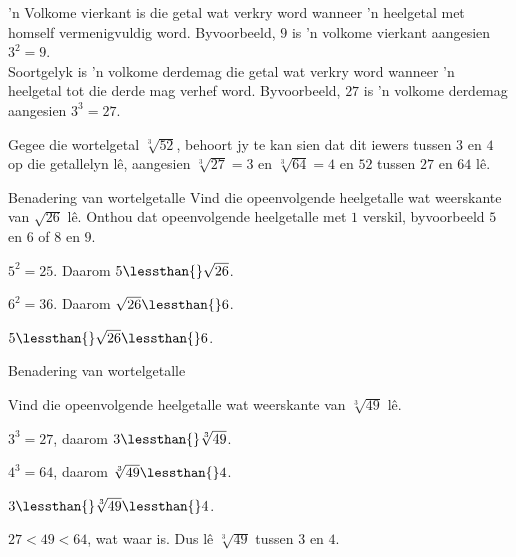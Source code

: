       
’n Volkome vierkant is die getal wat verkry word wanneer ’n heelgetal met homself vermenigvuldig word. Byvoorbeeld, $9$  is ’n volkome vierkant aangesien ${3}^{2}=9$. \\
Soortgelyk is ’n volkome derdemag die getal wat verkry word wanneer ’n heelgetal
tot die derde mag verhef word. Byvoorbeeld, $27$ is ’n volkome derdemag aangesien ${3}^{3}=27$.
\par 
Gegee die wortelgetal $\sqrt[3]{52}$, behoort jy te kan sien dat dit iewers tussen $3$ en $4$ op die getallelyn lê, aangesien $\sqrt[3]{27}=3$ en $\sqrt[3]{64}=4$ en $52$ tussen $27$ en $64$ lê.
\clearpage

\begin{wex}{Benadering van wortelgetalle}
{
Vind die opeenvolgende heelgetalle wat weerskante van $\sqrt{26}$ lê.
Onthou dat opeenvolgende heelgetalle met $1$ verskil, byvoorbeeld $5$ en $6$ of $8$ en $9$.
}
{
           
${5}^{2}=25$. Daarom $5\lessthan{}\sqrt{26}$.

${6}^{2}=36$. 
Daarom $\sqrt{26}\lessthan{}6$.

$5\lessthan{}\sqrt{26}\lessthan{}6$. 
}
\end{wex}


\begin{wex}{Benadering van wortelgetalle }{

Vind die opeenvolgende heelgetalle wat weerskante van $\sqrt[3]{49}$ lê.
}
{
   ${3}^{3}=27$, daarom $3\lessthan{}\sqrt[3]{49}$.

 ${4}^{3}=64$, daarom $\sqrt[3]{49}\lessthan{}4$. 

$3\lessthan{}\sqrt[3]{49}\lessthan{}4$.

$27<49<64$, wat waar is. Dus lê $\sqrt[3]{49}$ tussen $3$ en $4$.
}
\end{wex}

